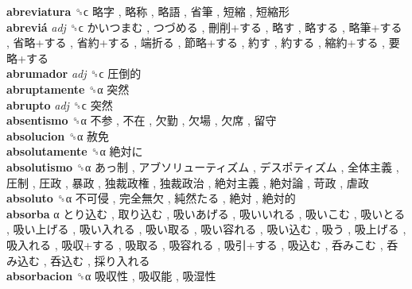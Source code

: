 \textbf{abreviatura} ␝ϲ   略字 ,  略称 ,  略語 ,  省筆 ,  短縮 ,  短縮形   \\
\textbf{abreviá} \emph{adj}  ␝ϲ   かいつまむ ,  つづめる ,  刪削+する ,  略す ,  略する ,  略筆+する ,  省略+する ,  省約+する ,  端折る ,  節略+する ,  約す ,  約する ,  縮約+する ,  要略+する   \\
\textbf{abrumador} \emph{adj}  ␝ϲ   圧倒的   \\
\textbf{abruptamente} ␝α   突然   \\
\textbf{abrupto} \emph{adj}  ␝ϲ   突然   \\
\textbf{absentismo} ␝α   不参 ,  不在 ,  欠勤 ,  欠場 ,  欠席 ,  留守   \\
\textbf{absolucion} ␝α   赦免   \\
\textbf{absolutamente} ␝α   絶対に   \\
\textbf{absolutismo} ␝α   あっ制 ,  アブソリューティズム ,  デスポティズム ,  全体主義 ,  圧制 ,  圧政 ,  暴政 ,  独裁政権 ,  独裁政治 ,  絶対主義 ,  絶対論 ,  苛政 ,  虐政   \\
\textbf{absoluto} ␝α   不可侵 ,  完全無欠 ,  純然たる ,  絶対 ,  絶対的   \\
\textbf{absorba} α   とり込む ,  取り込む ,  吸いあげる ,  吸いいれる ,  吸いこむ ,  吸いとる ,  吸い上げる ,  吸い入れる ,  吸い取る ,  吸い容れる ,  吸い込む ,  吸う ,  吸上げる ,  吸入れる ,  吸収+する ,  吸取る ,  吸容れる ,  吸引+する ,  吸込む ,  呑みこむ ,  呑み込む ,  呑込む ,  採り入れる   \\
\textbf{absorbacion} ␝α   吸収性 ,  吸収能 ,  吸湿性   \\
